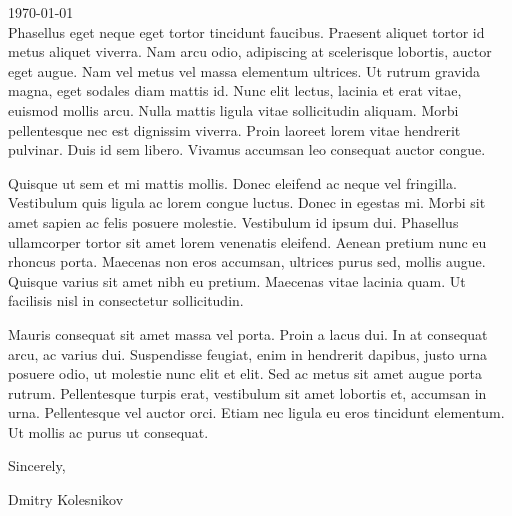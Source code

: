 



\setlength{\parindent}{1cm} %

\noindent \usdate \today \\

Phasellus eget neque eget tortor tincidunt faucibus. Praesent aliquet tortor id metus aliquet viverra. Nam arcu odio, adipiscing at scelerisque lobortis, auctor eget augue. Nam vel metus vel massa elementum ultrices. Ut rutrum gravida magna, eget sodales diam mattis id. Nunc elit lectus, lacinia et erat vitae, euismod mollis arcu. Nulla mattis ligula vitae sollicitudin aliquam. Morbi pellentesque nec est dignissim viverra. Proin laoreet lorem vitae hendrerit pulvinar. Duis id sem libero. Vivamus accumsan leo consequat auctor congue.

Quisque ut sem et mi mattis mollis. Donec eleifend ac neque vel fringilla. Vestibulum quis ligula ac lorem congue luctus. Donec in egestas mi. Morbi sit amet sapien ac felis posuere molestie. Vestibulum id ipsum dui. Phasellus ullamcorper tortor sit amet lorem venenatis eleifend. Aenean pretium nunc eu rhoncus porta. Maecenas non eros accumsan, ultrices purus sed, mollis augue. Quisque varius sit amet nibh eu pretium. Maecenas vitae lacinia quam. Ut facilisis nisl in consectetur sollicitudin.

Mauris consequat sit amet massa vel porta. Proin a lacus dui. In at consequat arcu, ac varius dui. Suspendisse feugiat, enim in hendrerit dapibus, justo urna posuere odio, ut molestie nunc elit et elit. Sed ac metus sit amet augue porta rutrum. Pellentesque turpis erat, vestibulum sit amet lobortis et, accumsan in urna. Pellentesque vel auctor orci. Etiam nec ligula eu eros tincidunt elementum. Ut mollis ac purus ut consequat.

\vspace{1cm}

\noindent Sincerely,

\noindent Dmitry Kolesnikov

